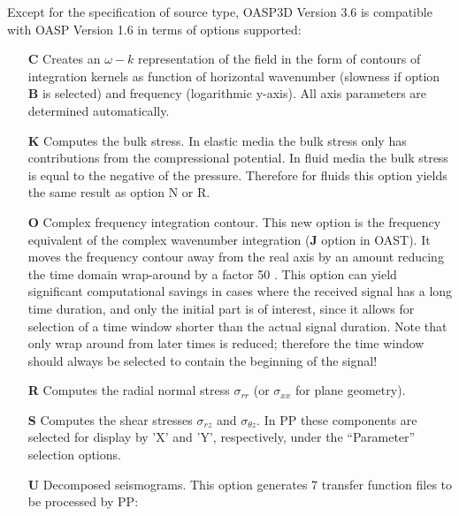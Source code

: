     Except for the specification of source type,
OASP3D Version 3.6 is compatible with OASP Version 1.6
in terms of options supported:
\begin{itemize}
    \item[{\bf C}]   Creates an $ \omega - k$ representation of the field in
      the form of  contours   of  integration  kernels  as   function   of 
          horizontal   wavenumber  (slowness  if  option   {\bf B}   is 
          selected) and frequency (logarithmic y-axis). All  axis 
          parameters are determined automatically. 
    \item[{\bf K}] Computes the bulk stress. In elastic media the bulk
	stress only has  contributions from the compressional potential. In
	fluid media the bulk stress is equal to the negative of the pressure.
	Therefore  for fluids this option yields the same result as option N
	or R.
    \item[{\bf O}]     Complex frequency integration contour. This new  option 
          is  the frequency equivalent of the complex  wavenumber 
          integration ({\bf J} option in OAST). It moves the  frequency 
          contour  away from the real axis by an amount  reducing 
          the time domain wrap-around by a factor 50 \cite{jkps}. This option 
          can  yield significant computational savings  in  cases 
          where the received signal has a long time duration, and 
          only  the initial part is of interest, since it  allows 
          for selection of a time window shorter than the  actual 
          signal duration. Note that only wrap around from  later 
          times  is  reduced; therefore the  time  window  should 
          always  be  selected to contain the  beginning  of  the 
          signal! 
    \item[{\bf R}] Computes the radial normal stress $\sigma_{rr}$ (or $\sigma_{xx}$ 			for plane geometry).
    \item[{\bf S}] Computes the shear stresses $\sigma_{rz}$ and 
		$\sigma_{ \theta z}$. In PP these components are
selected for display by 'X' and 'Y', respectively, under the
``Parameter'' selection options.
    \item[{\bf U}]     Decomposed   seismograms.  This  option  generates 7 
          transfer function files to be processed by PP:


\end{itemize}
